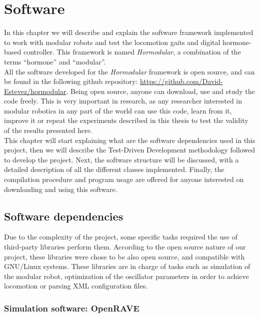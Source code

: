 \chapter{Software}
\label{software_chapter}

In this chapter we will describe and explain the software framework implemented to work with modular robots and test the locomotion gaits and digital hormone-based controller. This framework is named	\emph{Hormodular}, a combination of the terms ``hormone'' and ``modular''.\\

All the software developed for the \emph{Hormodular} framework is open source, and can be found in the following github repository: \url{https://github.com/David-Estevez/hormodular}. Being open source, anyone can download, use and study the code freely. This is very important in research, as any researcher interested in modular robotics in any part of the world can use this code, learn from it, improve it or repeat the experiments described in this thesis to test the validity of the results presented here.\\

This chapter will start explaining what are the software dependencies used in this project, then we will describe the Test-Driven Development methodology followed to develop the project. Next, the software structure will be discussed, with a detailed description of all the different classes implemented. Finally, the compilation procedure and program usage are offered for anyone interested on downloading and using this software.\\


\section{Software dependencies}
\label{software_dependencies}

Due to the complexity of the project, some specific tasks required the use of third-party libraries perform them. According to the open source nature of our project, these libraries were chose to be also open source, and compatible with GNU/Linux systems. These libraries are in charge of tasks such as simulation of the modular robot, optimization of the oscillator parameters in order to achieve locomotion or parsing XML configuration files.

\subsection{Simulation software: OpenRAVE}
\label{software_openRAVE}

